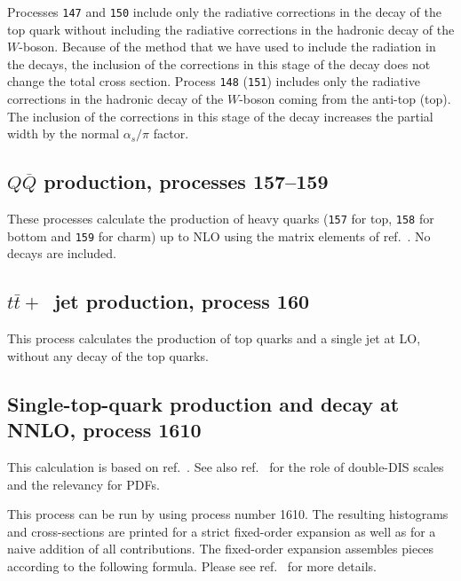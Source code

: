 Processes {\tt 147} and {\tt 150} include only the radiative 
corrections in the decay of the top quark without including 
the radiative corrections in the hadronic decay of the $W$-boson.
Because of the method that we have used to include the radiation in the decays,
the inclusion of the corrections in this stage of the decay does not change the
total cross section.
Process {\tt 148} ({\tt 151}) includes only the radiative corrections
in the hadronic decay of the $W$-boson coming from the anti-top (top).
The inclusion of the corrections in this stage of the decay increases the
partial width by the normal $\alpha_s/\pi$ factor.

\subsection{$Q\overline{Q}$ production, processes 157--159}
These processes calculate the production of heavy quarks
({\tt 157} for top, {\tt 158} for bottom and {\tt 159} for charm) up to NLO 
using the matrix elements of ref.~\cite{Nason:1987xz}. No decays
are included.

\subsection{$t{\bar t}+$~jet production, process 160}
This process calculates the production of top quarks and a single jet
at LO, without any decay of the top quarks.

\subsection{Single-top-quark production and decay at NNLO, process 1610}
\label{single-top-quark-production-and-decay-at-nnlo}

This calculation is based on ref.~\cite{Campbell:2020fhf}. See also
ref.~\cite{Campbell:2021qgd} for the role of double-DIS scales and the
relevancy for PDFs.

This process can be run by using process number 1610. The resulting
histograms and cross-sections are printed for a strict fixed-order
expansion as well as for a naive addition of all contributions. The
fixed-order expansion assembles pieces according to the following
formula. Please see ref.~\cite{Campbell:2020fhf} for more details.

